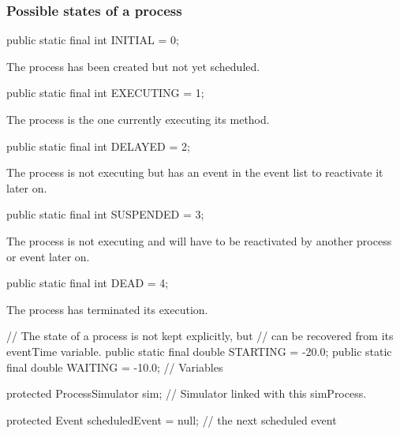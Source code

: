 \subsubsection*{Possible states of a process}

\begin{code}

   public static final int INITIAL   = 0;
\end{code}
\begin{tabb}   The process has been created but not yet scheduled. \end{tabb}
\begin{code}

   public static final int EXECUTING = 1;
\end{code}
\begin{tabb}   The process is the one currently executing its
    method. \end{tabb}
\begin{code}

   public static final int DELAYED   = 2;
\end{code}
\begin{tabb}   The process is not executing but has an event in the event list to
   reactivate it later on.  \end{tabb}
\begin{code}

   public static final int SUSPENDED = 3;
\end{code}
\begin{tabb}   The process is not executing and will have to be reactivated by another
   process or event later on.  \end{tabb}
\begin{code}

   public static final int DEAD      = 4;
\end{code}
\begin{tabb}   The process has terminated its execution.  \end{tabb}
\begin{code}\begin{hide}
   // The state of a process is not kept explicitly, but
   // can be recovered from its eventTime variable.
    public static final double STARTING = -20.0;
    public static final double WAITING  = -10.0;
    // Variables

   protected ProcessSimulator sim;
   // Simulator linked with this simProcess.

   protected Event scheduledEvent = null;
   // the next scheduled event
\end{hide}
\end{code}

